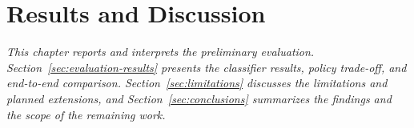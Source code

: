 \documentclass[12pt,phd,times]{pkmthesis}
\begin{document}
\chapter{Results and Discussion}\label{chap:results}
\vspace{-1cm}
\emph{This chapter reports and interprets the preliminary evaluation. Section~\ref{sec:evaluation-results} presents the classifier results, policy trade-off, and end-to-end comparison. Section~\ref{sec:limitations} discusses the limitations and planned extensions, and Section~\ref{sec:conclusions} summarizes the findings and the scope of the remaining work.}


\baselineskip 14pt
\small


\end{document}
